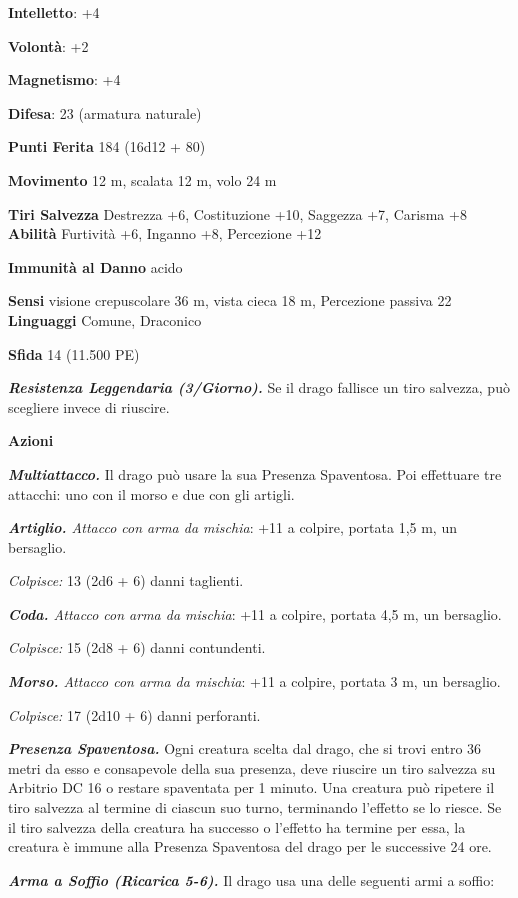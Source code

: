 \begin{multicols}{2}
\textbf{Intelletto}: +4

\textbf{Volontà}: +2

\textbf{Magnetismo}: +4

\textbf{Difesa}: 23 (armatura naturale)

\textbf{Punti Ferita} 184 (16d12 + 80)

\textbf{Movimento} 12 m, scalata 12 m, volo 24 m

\textbf{Tiri Salvezza} Destrezza +6, Costituzione +10, Saggezza +7,
Carisma +8 \textbf{Abilità} Furtività +6, Inganno +8, Percezione +12

\textbf{Immunità al Danno} acido

\textbf{Sensi} visione crepuscolare 36 m, vista cieca 18 m, Percezione passiva
22 \textbf{Linguaggi} Comune, Draconico

\textbf{Sfida} 14 (11.500 PE)

\emph{\textbf{Resistenza Leggendaria (3/Giorno).}} Se il drago fallisce
un tiro salvezza, può scegliere invece di riuscire.

\textbf{Azioni}

\emph{\textbf{Multiattacco.}} Il drago può usare la sua Presenza
Spaventosa. Poi effettuare tre attacchi: uno con il morso e due con gli
artigli.

\emph{\textbf{Artiglio.} Attacco con arma da mischia}: +11 a colpire,
portata 1,5 m, un bersaglio.

\emph{Colpisce:} 13 (2d6 + 6) danni taglienti.

\emph{\textbf{Coda.} Attacco con arma da mischia}: +11 a colpire,
portata 4,5 m, un bersaglio.

\emph{Colpisce:} 15 (2d8 + 6) danni contundenti.

\emph{\textbf{Morso.} Attacco con arma da mischia}: +11 a colpire,
portata 3 m, un bersaglio.

\emph{Colpisce:} 17 (2d10 + 6) danni perforanti.

\emph{\textbf{Presenza Spaventosa.}} Ogni creatura scelta dal drago, che
si trovi entro 36 metri da esso e consapevole della sua presenza, deve
riuscire un tiro salvezza su Arbitrio DC 16 o restare spaventata per 1
minuto. Una creatura può ripetere il tiro salvezza al termine di ciascun
suo turno, terminando l'effetto se lo riesce. Se il tiro salvezza della
creatura ha successo o l'effetto ha termine per essa, la creatura è
immune alla Presenza Spaventosa del drago per le successive 24 ore.

\emph{\textbf{Arma a Soffio (Ricarica 5-6).}} Il drago usa una delle
seguenti armi a soffio:


\end{multicols}
